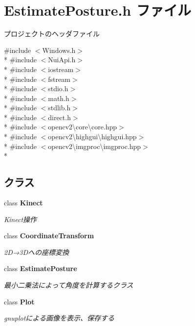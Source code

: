 \section{Estimate\-Posture.\-h ファイル}
\label{_estimate_posture_8h}


プロジェクトのヘッダファイル  


{\ttfamily \#include $<$Windows.\-h$>$}\\*
{\ttfamily \#include $<$Nui\-Api.\-h$>$}\\*
{\ttfamily \#include $<$iostream$>$}\\*
{\ttfamily \#include $<$fstream$>$}\\*
{\ttfamily \#include $<$stdio.\-h$>$}\\*
{\ttfamily \#include $<$math.\-h$>$}\\*
{\ttfamily \#include $<$stdlib.\-h$>$}\\*
{\ttfamily \#include $<$direct.\-h$>$}\\*
{\ttfamily \#include $<$opencv2\textbackslash{}core\textbackslash{}core.\-hpp$>$}\\*
{\ttfamily \#include $<$opencv2\textbackslash{}highgui\textbackslash{}highgui.\-hpp$>$}\\*
{\ttfamily \#include $<$opencv2\textbackslash{}imgproc\textbackslash{}imgproc.\-hpp$>$}\\*
\subsection*{クラス}
\begin{DoxyCompactItemize}
\item 
class {\bf Kinect}
\begin{DoxyCompactList}\small\item\em Kinect操作 \end{DoxyCompactList}\item 
class {\bf Coordinate\-Transform}
\begin{DoxyCompactList}\small\item\em 2\-D→3\-Dへの座標変換 \end{DoxyCompactList}\item 
class {\bf Estimate\-Posture}
\begin{DoxyCompactList}\small\item\em 最小二乗法によって角度を計算するクラス \end{DoxyCompactList}\item 
class {\bf Plot}
\begin{DoxyCompactList}\small\item\em gnuplotによる画像を表示、保存する \end{DoxyCompactList}\end{DoxyCompactItemize}
